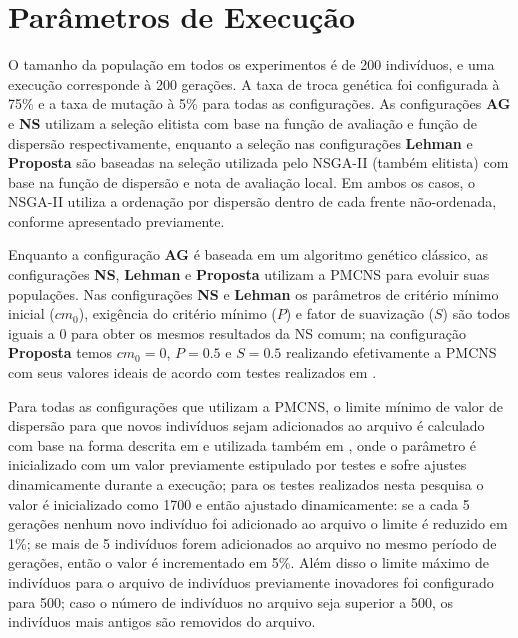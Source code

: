 \section{Parâmetros de Execução}

O tamanho da população em todos os experimentos é de 200 indivíduos, e uma execução corresponde à 200 gerações. A taxa de troca genética foi configurada à 75\% e a taxa de mutação à 5\% para todas as configurações. As configurações \textbf{AG} e \textbf{NS} utilizam a seleção elitista com base na função de avaliação e função de dispersão respectivamente, enquanto a seleção nas configurações \textbf{Lehman} e \textbf{Proposta} são baseadas na seleção utilizada pelo NSGA-II (também elitista) com base na função de dispersão e nota de avaliação local. Em ambos os casos, o NSGA-II utiliza a ordenação por dispersão dentro de cada frente não-ordenada, conforme apresentado previamente.

Enquanto a configuração \textbf{AG} é baseada em um algoritmo genético clássico, as configurações \textbf{NS}, \textbf{Lehman} e \textbf{Proposta} utilizam a PMCNS para evoluir suas populações. Nas configurações \textbf{NS} e \textbf{Lehman} os parâmetros de critério mínimo inicial (${cm}_0$), exigência do critério mínimo ($P$) e fator de suavização ($S$) são todos iguais a 0 para obter os mesmos resultados da NS comum; na configuração \textbf{Proposta} temos ${cm}_0=0$, $P=0.5$ e $S=0.5$ realizando efetivamente a PMCNS com seus valores ideais de acordo com testes realizados em \cite{gomes2012progressive}.

Para todas as configurações que utilizam a PMCNS, o limite mínimo de valor de dispersão para que novos indivíduos sejam adicionados ao arquivo é calculado com base na forma descrita em \cite{lehman2010revising} e utilizada também em \cite{gomes2012progressive}, onde o parâmetro é inicializado com um valor previamente estipulado por testes e sofre ajustes dinamicamente durante a execução; para os testes realizados nesta pesquisa o valor é inicializado como 1700 e então ajustado dinamicamente: se a cada 5 gerações nenhum novo indivíduo foi adicionado ao arquivo o limite é reduzido em 1\%; se mais de 5 indivíduos forem adicionados ao arquivo no mesmo período de gerações, então o valor é incrementado em 5\%. Além disso o limite máximo de indivíduos para o arquivo de indivíduos previamente inovadores foi configurado para 500; caso o número de indivíduos no arquivo seja superior a 500, os indivíduos mais antigos são removidos do arquivo.

